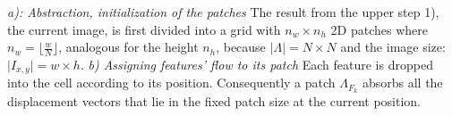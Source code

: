 \textit{a): Abstraction, initialization of the patches} \newline
The result from the upper step 1), the current image, is first divided into a grid with $n_w \times n_h$ 2D patches where $n_w = \lfloor \frac{w}{N} \rfloor$, analogous for the height $n_h$, because $\vert \Lambda \vert = N \times N$ and the image size: $\vert I_{x,y} \vert = w \times h$. \newline
%
\textit{b) Assigning features' flow to its patch} \newline
Each feature is dropped into the cell according to its position. Consequently a patch $\Lambda_{F_k}$ absorbs all the displacement vectors that lie in the fixed patch size at the current position.\\
